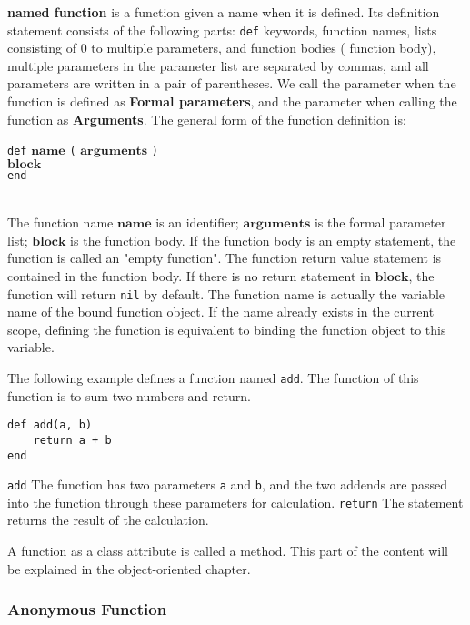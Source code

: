 \textbf{named function} is a function given a name when it is defined. Its definition statement consists of the following parts: \texttt{def} keywords, function names, lists consisting of 0 to multiple parameters, and function bodies ( function body), multiple parameters in the parameter list are separated by commas, and all parameters are written in a pair of parentheses. We call the parameter when the function is defined as \textbf{Formal parameters}, and the parameter when calling the function as \textbf{Arguments}. The general form of the function definition is:
\begin{algorithm}
    \texttt{def} $\bm{name}$ \texttt{(} $\bm{arguments}$ \texttt{)} \\
        \qquad $\bm{block}$ \\
    \texttt{end}
\end{algorithm}\vspace{-0.6em}\\
The function name $\bm{name}$ is an identifier; $\bm{arguments}$ is the formal parameter list; $\bm{block}$ is the function body. If the function body is an empty statement, the function is called an "empty function". The function return value statement is contained in the function body. If there is no return statement in $\bm{block}$, the function will return \texttt{nil} by default. The function name is actually the variable name of the bound function object. If the name already exists in the current scope, defining the function is equivalent to binding the function object to this variable.

The following example defines a function named \texttt{add}. The function of this function is to sum two numbers and return.
\begin{lstlisting}[language=berry, numbers=none]
def add(a, b)
    return a + b
end
\end{lstlisting}
\texttt{add} The function has two parameters \texttt{a} and \texttt{b}, and the two addends are passed into the function through these parameters for calculation. \texttt{return} The statement returns the result of the calculation.

A function as a class attribute is called a method. This part of the content will be explained in the object-oriented chapter.

\subsubsection {Anonymous Function}

